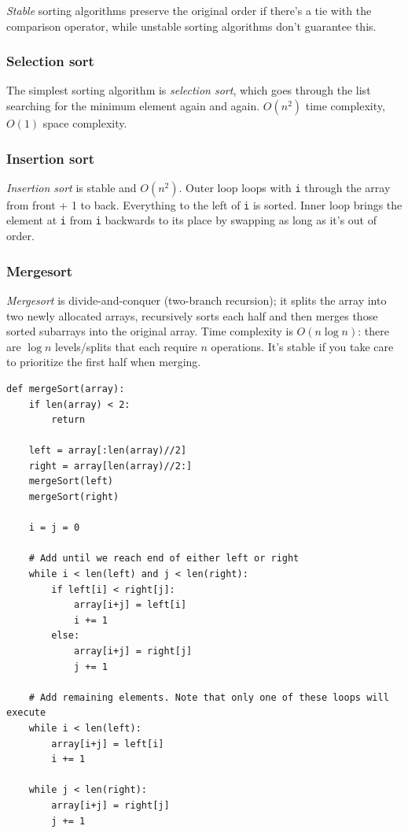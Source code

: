 \documentclass[table, xcdraw]{article}%
\begin{document}
\emph{Stable} sorting algorithms preserve the original order if there's a tie with the comparison operator, while unstable sorting algorithms don't guarantee this.

\subsubsection{Selection sort}

The simplest sorting algorithm is \emph{selection sort}, which goes through the list searching for the minimum element again and again. $O(n^2)$ time complexity, $O(1)$ space complexity.

\subsubsection{Insertion sort}

\emph{Insertion sort} is stable and $O(n^2)$. Outer loop loops with \texttt{i} through the array from front + 1 to back. Everything to the left of \texttt{i} is sorted. Inner loop brings the element at \texttt{i} from \texttt{i} backwards to its place by swapping as long as it's out of order.

\subsubsection{Mergesort}

\emph{Mergesort} is divide-and-conquer (two-branch recursion); it splits the array into two newly allocated arrays, recursively sorts each half and then merges those sorted subarrays into the original array. Time complexity is $O(n \log n)$: there are $\log n$ levels/splits that each require $n$ operations. It's stable if you take care to prioritize the first half when merging.

\begin{verbatim}
def mergeSort(array):
    if len(array) < 2:
        return
    
    left = array[:len(array)//2]
    right = array[len(array)//2:]
    mergeSort(left)
    mergeSort(right)

    i = j = 0

    # Add until we reach end of either left or right
    while i < len(left) and j < len(right):
        if left[i] < right[j]:
            array[i+j] = left[i]
            i += 1
        else:
            array[i+j] = right[j]
            j += 1

    # Add remaining elements. Note that only one of these loops will execute
    while i < len(left):
        array[i+j] = left[i]
        i += 1

    while j < len(right):
        array[i+j] = right[j]
        j += 1
\end{verbatim}
\end{document}
